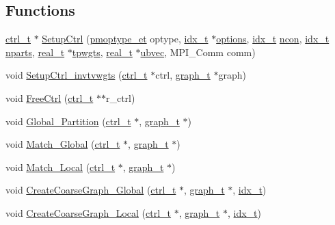 \subsection*{Functions}
\begin{DoxyCompactItemize}
\item 
\hyperlink{a00742}{ctrl\+\_\+t} $\ast$ \hyperlink{a00951_a0825cb8d3761f52e758d1f8d0ade36f5}{Setup\+Ctrl} (\hyperlink{a00840_a8f61c0f0e4ba81b0e3b6901026acb936}{pmoptype\+\_\+et} optype, \hyperlink{a00876_aaa5262be3e700770163401acb0150f52}{idx\+\_\+t} $\ast$\hyperlink{a00879_a68c032ed4161802775c6847d4cb39adf}{options}, \hyperlink{a00876_aaa5262be3e700770163401acb0150f52}{idx\+\_\+t} \hyperlink{a00879_ac1dd31740e8f97fb57dc917ded30253f}{ncon}, \hyperlink{a00876_aaa5262be3e700770163401acb0150f52}{idx\+\_\+t} \hyperlink{a00879_aad88065af88fd6759101788a8e15ce9e}{nparts}, \hyperlink{a00876_a1924a4f6907cc3833213aba1f07fcbe9}{real\+\_\+t} $\ast$\hyperlink{a00879_aa91786cd8ea996ec49ed5b382eb7fc2f}{tpwgts}, \hyperlink{a00876_a1924a4f6907cc3833213aba1f07fcbe9}{real\+\_\+t} $\ast$\hyperlink{a00879_af48bb348bc8440a61f90f137de83f203}{ubvec}, M\+P\+I\+\_\+\+Comm comm)
\item 
void \hyperlink{a00951_addb1218f833155110864d49f0d1879ab}{Setup\+Ctrl\+\_\+invtvwgts} (\hyperlink{a00742}{ctrl\+\_\+t} $\ast$ctrl, \hyperlink{a00734}{graph\+\_\+t} $\ast$graph)
\item 
void \hyperlink{a00951_ab44b3384fa925eae532b7bcc825159d7}{Free\+Ctrl} (\hyperlink{a00742}{ctrl\+\_\+t} $\ast$$\ast$r\+\_\+ctrl)
\item 
void \hyperlink{a00951_a979ec26537f665b3e2b098595fde106c}{Global\+\_\+\+Partition} (\hyperlink{a00742}{ctrl\+\_\+t} $\ast$, \hyperlink{a00734}{graph\+\_\+t} $\ast$)
\item 
void \hyperlink{a00951_a52c5a0edb61660b28b0b90629a76adea}{Match\+\_\+\+Global} (\hyperlink{a00742}{ctrl\+\_\+t} $\ast$, \hyperlink{a00734}{graph\+\_\+t} $\ast$)
\item 
void \hyperlink{a00951_a590439d0c0ae8d57d32bbd468b283345}{Match\+\_\+\+Local} (\hyperlink{a00742}{ctrl\+\_\+t} $\ast$, \hyperlink{a00734}{graph\+\_\+t} $\ast$)
\item 
void \hyperlink{a00951_add46f66d0e9d6c06e9bf36b386918c83}{Create\+Coarse\+Graph\+\_\+\+Global} (\hyperlink{a00742}{ctrl\+\_\+t} $\ast$, \hyperlink{a00734}{graph\+\_\+t} $\ast$, \hyperlink{a00876_aaa5262be3e700770163401acb0150f52}{idx\+\_\+t})
\item 
void \hyperlink{a00951_a15f0a144812a3f4ab58bb38a3398103d}{Create\+Coarse\+Graph\+\_\+\+Local} (\hyperlink{a00742}{ctrl\+\_\+t} $\ast$, \hyperlink{a00734}{graph\+\_\+t} $\ast$, \hyperlink{a00876_aaa5262be3e700770163401acb0150f52}{idx\+\_\+t})
$$
\end{DoxyCompactItemize}
